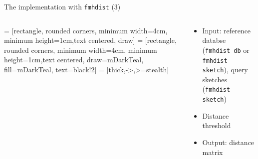 \documentclass[aspectratio=169]{beamer}
\begin{document}
\begin{frame}{The implementation with \texttt{fmhdist} (3)}
    \begin{columns}
        \begin{column}{0.5\textwidth}
             = [rectangle, rounded corners, minimum width=4cm, minimum height=1cm,text centered, draw]
             = [rectangle, rounded corners, minimum width=4cm, minimum height=1cm,text centered, draw=mDarkTeal, fill=mDarkTeal, text=black!2]
             = [thick,->,>=stealth]
        \end{column}
        \begin{column}{0.5\textwidth}
            \begin{itemize}
                \item Input: reference databse (\texttt{fmhdist db} or \texttt{fmhdist sketch}), query sketches (\texttt{fmhdist sketch})
                \item Distance threshold
                \item Output: distance matrix
            \end{itemize}
        \end{column}
        \end{columns}   
\end{frame}
\end{document}
